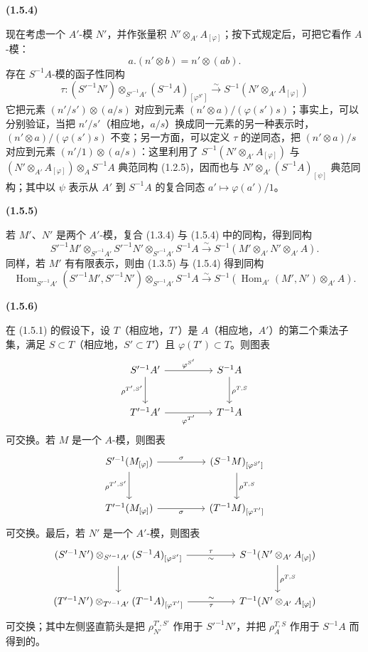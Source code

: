 \documentclass[UTF8,fontset=none,11pt,oneside,openany]{ctexbook}
\newenvironment{env}[1][]{%
  \par\medskip\noindent\textbf{(#1)}\ %
}{\par}
\newcommand{\oldpage}[2][]{%
  \hypertarget{ega-source-page-#1-#2}{}%
  \marginnote{\scriptsize\textbf{#1}~|~#2}\ignorespaces}
\let\EGAOriginalLabel\label
\renewcommand{\label}[1]{\phantomsection\EGAOriginalLabel{#1}}
\begin{document}
\begin{env}[1.5.4]
\label{0.1.5.4-fr}
现在考虑一个 $A'$-模 $N'$，并作张量积 $N'\otimes_{A'}A_{[\varphi]}$；按下式规定后，可把它看作 $A$-模：
\[
  a.(n'\otimes b)=n'\otimes(ab).
\]
存在 $S^{-1}A$-模的函子性同构
\[
  \tau:(S'^{-1}N')\otimes_{S'^{-1}A'}(S^{-1}A)_{[\varphi^{S'}]}
  \xrightarrow{\sim}
  S^{-1}(N'\otimes_{A'}A_{[\varphi]})
\]
\oldpage[0\textsubscript{I}]{18}
它把元素 $(n'/s')\otimes(a/s)$ 对应到元素
$(n'\otimes a)/(\varphi(s')s)$；事实上，可以分别验证，当把 $n'/s'$（相应地，$a/s$）换成同一元素的另一种表示时，
$(n'\otimes a)/(\varphi(s')s)$ 不变；另一方面，可以定义 $\tau$ 的逆同态，把 $(n'\otimes a)/s$ 对应到元素 $(n'/1)\otimes(a/s)$：这里利用了
$S^{-1}(N'\otimes_{A'}A_{[\varphi]})$ 与
$(N'\otimes_{A'}A_{[\varphi]})\otimes_A S^{-1}A$ 典范同构 (1.2.5)，因而也与
$N'\otimes_{A'}(S^{-1}A)_{[\psi]}$ 典范同构；其中以 $\psi$ 表示从 $A'$ 到 $S^{-1}A$ 的复合同态 $a'\mapsto\varphi(a')/1$。
\end{env}

\begin{env}[1.5.5]
\label{0.1.5.5-fr}
若 $M'$、$N'$ 是两个 $A'$-模，复合 (1.3.4) 与 (1.5.4) 中的同构，得到同构
\[
  S'^{-1}M'\otimes_{S'^{-1}A'}S'^{-1}N'
  \otimes_{S'^{-1}A'}S^{-1}A
  \xrightarrow{\sim}
  S^{-1}(M'\otimes_{A'}N'\otimes_{A'}A).
\]
同样，若 $M'$ 有有限表示，则由 (1.3.5) 与 (1.5.4) 得到同构
\[
  \operatorname{Hom}_{S'^{-1}A'}(S'^{-1}M',S'^{-1}N')
  \otimes_{S'^{-1}A'}S^{-1}A
  \xrightarrow{\sim}
  S^{-1}(\operatorname{Hom}_{A'}(M',N')\otimes_{A'}A).
\]
\end{env}

\begin{env}[1.5.6]
\label{0.1.5.6-fr}
在 (1.5.1) 的假设下，设 $T$（相应地，$T'$）是 $A$（相应地，$A'$）的第二个乘法子集，满足 $S\subset T$（相应地，$S'\subset T'$）且 $\varphi(T')\subset T$。则图表
\[
\begin{tikzcd}[column sep=huge,row sep=large]
S'^{-1}A' \arrow[r,"\varphi^{S'}"] \arrow[d,"\rho^{T',S'}"']
  & S^{-1}A \arrow[d,"\rho^{T,S}"] \\
T'^{-1}A' \arrow[r,"\varphi^{T'}"']
  & T^{-1}A
\end{tikzcd}
\]
可交换。若 $M$ 是一个 $A$-模，则图表
\[
\begin{tikzcd}[column sep=huge,row sep=large]
S'^{-1}(M_{[\varphi]}) \arrow[r,"\sigma"] \arrow[d,"\rho^{T',S'}"']
  & (S^{-1}M)_{[\varphi^{S'}]} \arrow[d,"\rho^{T,S}"] \\
T'^{-1}(M_{[\varphi]}) \arrow[r,"\sigma"']
  & (T^{-1}M)_{[\varphi^{T'}]}
\end{tikzcd}
\]
可交换。最后，若 $N'$ 是一个 $A'$-模，则图表
\[
\begin{tikzcd}[column sep=huge,row sep=large]
(S'^{-1}N')\otimes_{S'^{-1}A'}(S^{-1}A)_{[\varphi^{S'}]}
  \arrow[r,"\tau","{\sim}"'] \arrow[d]
  & S^{-1}(N'\otimes_{A'}A_{[\varphi]}) \arrow[d,"\rho^{T,S}"] \\
(T'^{-1}N')\otimes_{T'^{-1}A'}(T^{-1}A)_{[\varphi^{T'}]}
  \arrow[r,"\tau"',"{\sim}"]
  & T^{-1}(N'\otimes_{A'}A_{[\varphi]})
\end{tikzcd}
\]
可交换；其中左侧竖直箭头是把 $\rho_{N'}^{T',S'}$ 作用于 $S'^{-1}N'$，并把 $\rho_A^{T,S}$ 作用于 $S^{-1}A$ 而得到的。
\end{env}
\end{document}
